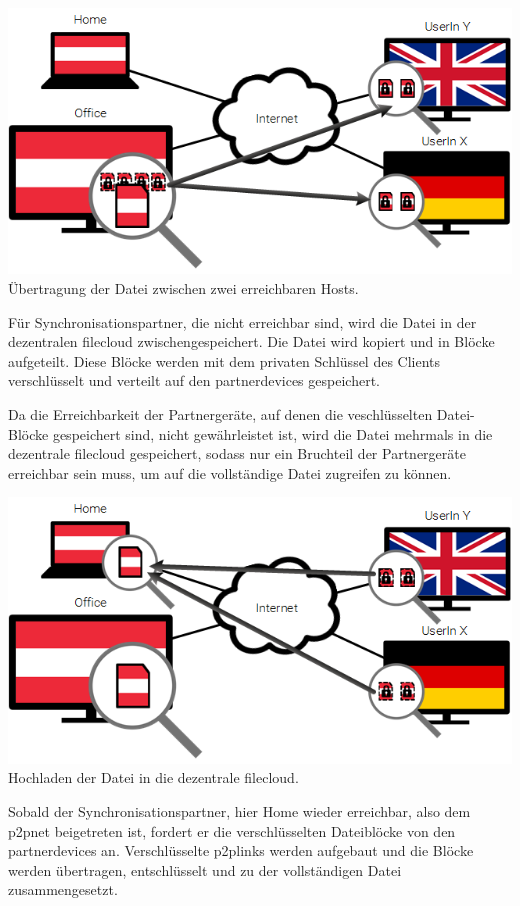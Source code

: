 \includegraphics[]{images/sblit_1}
Übertragung der Datei zwischen zwei erreichbaren Hosts.

Für Synchronisationspartner, die nicht erreichbar sind, wird die Datei in der dezentralen
\gls{filecloud} zwischengespeichert. Die Datei wird kopiert und in Blöcke
aufgeteilt. Diese Blöcke werden mit dem privaten Schlüssel des Clients
verschlüsselt und verteilt auf den \glspl{partnerdevice} gespeichert.

Da die Erreichbarkeit der Partnergeräte, auf denen die veschlüsselten
Datei-Blöcke gespeichert sind, nicht gewährleistet ist, wird die Datei mehrmals
in die dezentrale \gls{filecloud} gespeichert, sodass nur ein Bruchteil der
Partnergeräte erreichbar sein muss, um auf die vollständige Datei zugreifen zu
können.

\includegraphics[]{images/sblit_2}
Hochladen der Datei in die dezentrale \gls{filecloud}.

Sobald der Synchronisationspartner, hier Home wieder erreichbar, also dem
\gls{p2pnet} beigetreten ist, fordert er die verschlüsselten
Dateiblöcke von den \glspl{partnerdevice} an. Verschlüsselte \glspl{p2plink}
werden aufgebaut und die Blöcke werden übertragen, entschlüsselt und zu der
vollständigen Datei zusammengesetzt.

